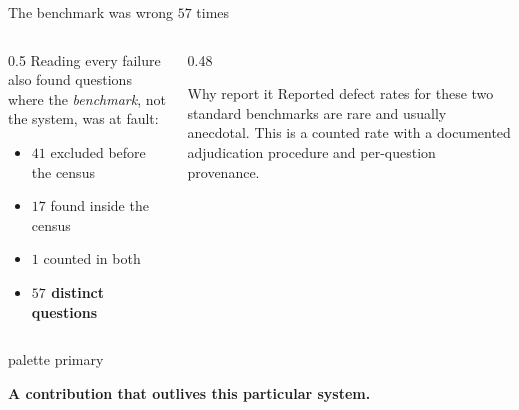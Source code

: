 \documentclass[aspectratio=169,12pt]{beamer}
\newcommand{\takeaway}[1]{%
  \vspace{1.5mm}%
  \begin{beamercolorbox}[wd=\dimexpr\textwidth-4.4mm\relax,sep=2.2mm,
    rounded=true]{palette primary}%
    \color{agrdark}\small\raggedright\textbf{#1}%
  \end{beamercolorbox}}
\begin{document}
\begin{frame}{The benchmark was wrong $57$ times}
  \begin{columns}[T]
    \begin{column}{0.5\textwidth}
      \small
      Reading every failure also found questions where the \emph{benchmark},
      not the system, was at fault:
      \begin{itemize}
        \item $41$ excluded before the census
        \item $17$ found inside the census
        \item $1$ counted in both
        \item[$\Rightarrow$] \textbf{$57$ distinct questions}
      \end{itemize}
    \end{column}
    \begin{column}{0.48\textwidth}
      \begin{block}{Why report it}
        \small
        Reported defect rates for these two standard benchmarks are rare and
        usually anecdotal. This is a counted rate with a documented
        adjudication procedure and per-question provenance.
      \end{block}
    \end{column}
  \end{columns}
  \takeaway{A contribution that outlives this particular system.}
\end{frame}
\end{document}
